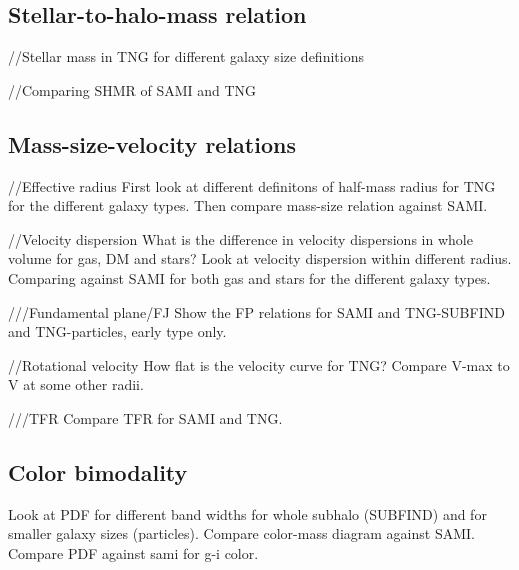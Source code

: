 \subsection{Stellar-to-halo-mass relation}

//Stellar mass in TNG for different galaxy size definitions

//Comparing SHMR of SAMI and TNG


\subsection{Mass-size-velocity relations}

//Effective radius
First look at different definitons of half-mass radius for TNG for the different galaxy types.
Then compare mass-size relation against SAMI.

//Velocity dispersion
What is the difference in velocity dispersions in whole volume for gas, DM and stars?
Look at velocity dispersion within different radius. 
Comparing against SAMI for both gas and stars for the different galaxy types.

///Fundamental plane/FJ
Show the FP relations for SAMI and TNG-SUBFIND and TNG-particles, early type only.

//Rotational velocity
How flat is the velocity curve for TNG? Compare V-max to V at some other radii.

///TFR
Compare TFR for SAMI and TNG.

\subsection{Color bimodality}

Look at PDF for different band widths for whole subhalo (SUBFIND) and for smaller galaxy sizes (particles).
Compare color-mass diagram against SAMI.
Compare PDF against sami for g-i color.